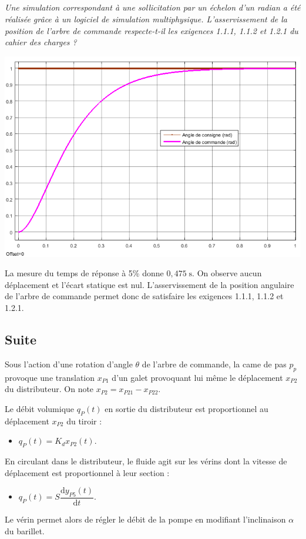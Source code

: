 \documentclass[10pt,fleqn]{article} %
\begin{document}
\begin{multicols}{2}
\subparagraph{}
\textit{Une simulation correspondant à une sollicitation par un échelon d'un radian a été réalisée grâce à un logiciel de simulation multiphysique. L'asservissement de la position de l'arbre de commande respecte-t-il les exigences 1.1.1, 1.1.2 et 1.2.1 du cahier des charges ?}
\begin{center}
\includegraphics[width=.45\textwidth]{images/simu_1}
\end{center}

\begin{corrige}
La mesure du temps de réponse à 5\% donne $0,475 \; \text{s}$. On observe aucun déplacement et l'écart statique est nul. L'asservissement de la position angulaire de l'arbre de commande permet donc de satisfaire les exigences 1.1.1, 1.1.2 et 1.2.1.
\end{corrige}


\subsection*{Suite}

Sous l'action d'une rotation d'angle $\theta$ de l'arbre de commande, la came de pas $p_p$ provoque une translation $x_{P1}$ d'un galet provoquant lui même le déplacement $x_{P2}$ du distributeur. On note $x_{P2}=x_{P21}-x_{P22}$.

Le débit volumique $q_P(t)$ en sortie du distributeur est proportionnel au déplacement $x_{P2}$ du tiroir : 
\begin{itemize}
\item $q_P(t)=K_d x_{P2}(t)$.
\end{itemize}

En circulant dans le distributeur, le fluide agit sur les vérins dont la vitesse de déplacement est proportionnel à leur section : 
\begin{itemize}
\item $q_{P}(t)= S \dfrac{\text{d}y_{P5}(t)}{\text{d}t}$.
\end{itemize}


Le vérin permet alors de régler le débit de la pompe en modifiant l'inclinaison $\alpha$ du barillet.



\end{multicols}
\end{document}
